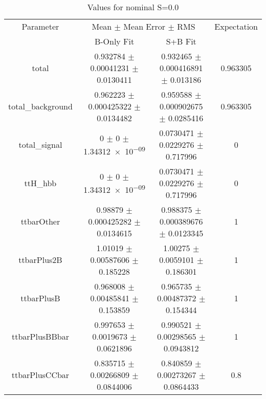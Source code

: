 \begin{table}
\centering
\caption{Values for nominal S=0.0}
\begin{tabular}{cccc}
\toprule
Parameter & \multicolumn{2}{c}{Mean $\pm$ Mean Error $\pm$ RMS} & Expectation\\
 & B-Only Fit & S+B Fit & \\
\midrule
total & \num{0.932784} $\pm$ \num{0.00041231} $\pm$ \num{0.0130411} & \num{0.932465} $\pm$ \num{0.000416891} $\pm$ \num{0.013186} & \num{0.963305}\\
total\_background & \num{0.962223} $\pm$ \num{0.000425322} $\pm$ \num{0.0134482} & \num{0.959588} $\pm$ \num{0.000902675} $\pm$ \num{0.0285416} & \num{0.963305}\\
total\_signal & \num{0} $\pm$ \num{0} $\pm$ \num{1.34312e-09} & \num{0.0730471} $\pm$ \num{0.0229276} $\pm$ \num{0.717996} & \num{0}\\
ttH\_hbb & \num{0} $\pm$ \num{0} $\pm$ \num{1.34312e-09} & \num{0.0730471} $\pm$ \num{0.0229276} $\pm$ \num{0.717996} & \num{0}\\
ttbarOther & \num{0.98879} $\pm$ \num{0.000425282} $\pm$ \num{0.0134615} & \num{0.988375} $\pm$ \num{0.000389676} $\pm$ \num{0.0123345} & \num{1}\\
ttbarPlus2B & \num{1.01019} $\pm$ \num{0.00587606} $\pm$ \num{0.185228} & \num{1.00275} $\pm$ \num{0.0059101} $\pm$ \num{0.186301} & \num{1}\\
ttbarPlusB & \num{0.968008} $\pm$ \num{0.00485841} $\pm$ \num{0.153859} & \num{0.965735} $\pm$ \num{0.00487372} $\pm$ \num{0.154344} & \num{1}\\
ttbarPlusBBbar & \num{0.997653} $\pm$ \num{0.0019673} $\pm$ \num{0.0621896} & \num{0.990521} $\pm$ \num{0.00298565} $\pm$ \num{0.0943812} & \num{1}\\
ttbarPlusCCbar & \num{0.835715} $\pm$ \num{0.00266809} $\pm$ \num{0.0844006} & \num{0.840859} $\pm$ \num{0.00273267} $\pm$ \num{0.0864433} & \num{0.8}\\
\bottomrule
\end{tabular}
\end{table}